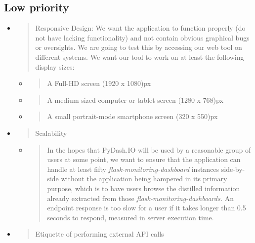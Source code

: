 \hypertarget{low-priority-1}{%
\subsection{Low priority}\label{low-priority-1}}

\begin{itemize}
\item
  \begin{quote}
  Responsive Design: We want the application to function properly (do
  not have lacking functionality) and not contain obvious graphical bugs
  or oversights. We are going to test this by accessing our web tool on
  different systems. We want our tool to work on at least the following
  display sizes:
  \end{quote}

  \begin{itemize}
  \item
    \begin{quote}
    A Full-HD screen (1920 x 1080)px
    \end{quote}
  \item
    \begin{quote}
    A medium-sized computer or tablet screen (1280 x 768)px
    \end{quote}
  \item
    \begin{quote}
    A small portrait-mode smartphone screen (320 x 550)px
    \end{quote}
  \end{itemize}
\item
  \begin{quote}
  Scalability
  \end{quote}

  \begin{itemize}
  \item
    \begin{quote}
    In the hopes that PyDash.IO will be used by a reasonable group of
    users at some point, we want to ensure that the application can
    handle at least fifty \emph{flask-monitoring-dashboard} instances
    side-by-side without the application being hampered in its primary
    purpose, which is to have users browse the distilled information
    already extracted from those \emph{flask-monitoring-dashboards.} An
    endpoint response is too slow for a user if it takes longer than 0.5
    seconds to respond, measured in server execution time.
    \end{quote}
  \end{itemize}
\item
  \begin{quote}
  Etiquette of performing external API calls
  \end{quote}


\end{itemize}
